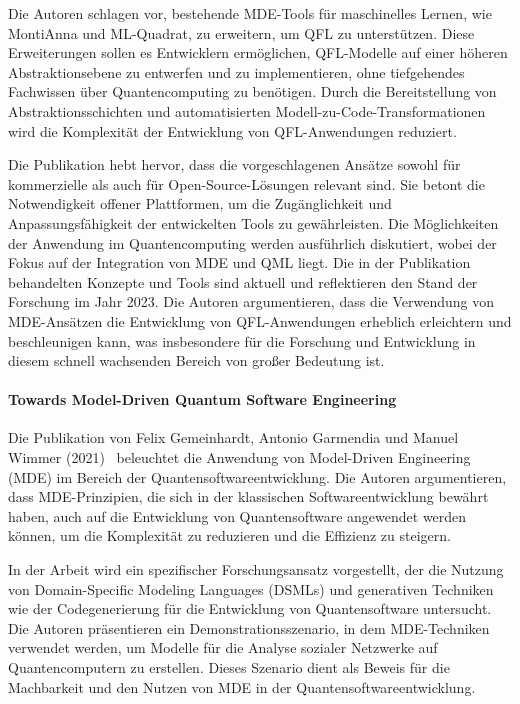 Die Autoren schlagen vor, bestehende MDE-Tools für maschinelles Lernen, wie MontiAnna und ML-Quadrat, zu erweitern, um QFL 
zu unterstützen. Diese Erweiterungen sollen es Entwicklern ermöglichen, QFL-Modelle auf einer höheren 
Abstraktionsebene zu entwerfen und zu implementieren, ohne tiefgehendes Fachwissen über Quantencomputing zu benötigen. 
Durch die Bereitstellung von Abstraktionsschichten und automatisierten Modell-zu-Code-Transformationen wird die Komplexität 
der Entwicklung von QFL-Anwendungen reduziert.

Die Publikation hebt hervor, dass die vorgeschlagenen Ansätze sowohl für kommerzielle als auch für 
Open-Source-Lösungen relevant sind. Sie betont die Notwendigkeit offener Plattformen, um die Zugänglichkeit und 
Anpassungsfähigkeit der entwickelten Tools zu gewährleisten. Die Möglichkeiten der Anwendung im Quantencomputing werden 
ausführlich diskutiert, wobei der Fokus auf der Integration von MDE und QML liegt. Die in der Publikation 
behandelten Konzepte und Tools sind aktuell und reflektieren den Stand der Forschung im Jahr 2023. 
Die Autoren argumentieren, dass die Verwendung von MDE-Ansätzen die Entwicklung von QFL-Anwendungen 
erheblich erleichtern und beschleunigen kann, was insbesondere für die Forschung und 
Entwicklung in diesem schnell wachsenden Bereich von großer Bedeutung ist.

\paragraph{Towards Model-Driven Quantum Software Engineering}

Die Publikation von Felix Gemeinhardt, Antonio Garmendia und Manuel Wimmer (2021)~\cite{gemeinhardt2021towards} beleuchtet die Anwendung von 
Model-Driven Engineering (MDE) im Bereich der Quantensoftwareentwicklung. Die Autoren argumentieren, dass MDE-Prinzipien, 
die sich in der klassischen Softwareentwicklung bewährt haben, auch auf die Entwicklung von Quantensoftware angewendet 
werden können, um die Komplexität zu reduzieren und die Effizienz zu steigern.

In der Arbeit wird ein spezifischer Forschungsansatz vorgestellt, der die Nutzung von Domain-Specific Modeling Languages (DSMLs) und 
generativen Techniken wie der Codegenerierung für die Entwicklung von Quantensoftware untersucht. Die Autoren 
präsentieren ein Demonstrationsszenario, in dem MDE-Techniken verwendet werden, um Modelle für die Analyse 
sozialer Netzwerke auf Quantencomputern zu erstellen. Dieses Szenario dient als Beweis für die Machbarkeit 
und den Nutzen von MDE in der Quantensoftwareentwicklung.

